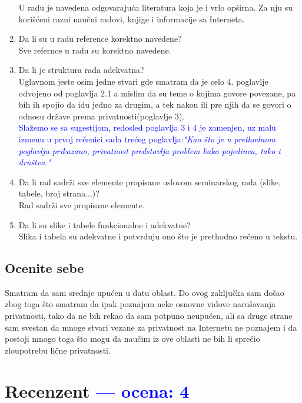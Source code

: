 \documentclass[a4paper]{report}
\newcommand{\odgovor}[1]{\textcolor{blue}{#1}}
\begin{document}
\begin{enumerate}
U radu je navedena odgovarajuća literatura koja je i vrlo opširna. Za nju su korišćeni razni naučni radovi, knjige i informacije sa Interneta. 
\item Da li su u radu reference korektno navedene?\\
Sve refernce u radu su korektno navedene.
\item Da li je struktura rada adekvatna?\\
Uglavnom jeste osim jedne stvari gde smatram da je celo 4. poglavlje odvojeno od poglavlja 2.1 a mislim da su teme o kojima govore povezane, pa bih ih spojio da idu jedno za drugim, a tek nakon ili pre njih da se govori o odnosu države prema privatnosti(poglavlje 3).
\\
\odgovor{Slažemo se sa sugestijom, redosled poglavlja 3 i 4 je zamenjen, uz malu izmenu u prvoj rečenici sada trećeg poglavlja:\emph{"Kao što je u prethodnom poglavlju prikazano, privatnost predstavlja problem kako pojedinca, tako i društva."}}
\item Da li rad sadrži sve elemente propisane uslovom seminarskog rada (slike, tabele, broj strana...)?\\
Rad sadrži sve propisane elemente.
\item Da li su slike i tabele funkcionalne i adekvatne?\\
Slika i tabela su adekvatne i potvrđuju ono što je prethodno rečeno u tekstu.
\end{enumerate}

\section{Ocenite sebe}
Smatram da sam srednje upućen u datu oblast. Do ovog zaključka sam došao zbog toga što smatram da ipak poznajem neke osnovne vidove narušavanja privatnosti, tako da ne bih rekao da sam potpuno neupućen, ali sa druge strane sam svestan da mnoge stvari vezane za privatnost na Internetu ne poznajem i da postoji mnogo toga što mogu da naučim iz ove oblasti ne bih li sprečio zloupotrebu lične privatnosti. 

\chapter{Recenzent \odgovor{--- ocena: 4} }
\end{document}
